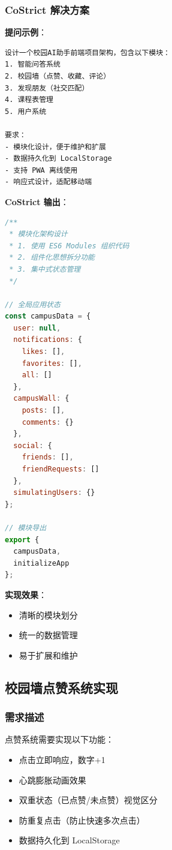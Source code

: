 \documentclass[12pt,a4paper]{article}
\begin{document}
\subsubsection{CoStrict 解决方案}

\textbf{提问示例}：
\begin{verbatim}
设计一个校园AI助手前端项目架构，包含以下模块：
1. 智能问答系统
2. 校园墙（点赞、收藏、评论）
3. 发现朋友（社交匹配）
4. 课程表管理
5. 用户系统

要求：
- 模块化设计，便于维护和扩展
- 数据持久化到 LocalStorage
- 支持 PWA 离线使用
- 响应式设计，适配移动端
\end{verbatim}

\textbf{CoStrict 输出}：

\begin{lstlisting}[language=JavaScript, caption={模块化架构设计}]
/**
 * 模块化架构设计
 * 1. 使用 ES6 Modules 组织代码
 * 2. 组件化思想拆分功能
 * 3. 集中式状态管理
 */

// 全局应用状态
const campusData = {
  user: null,
  notifications: {
    likes: [],
    favorites: [],
    all: []
  },
  campusWall: {
    posts: [],
    comments: {}
  },
  social: {
    friends: [],
    friendRequests: []
  },
  simulatingUsers: {}
};

// 模块导出
export {
  campusData,
  initializeApp
};
\end{lstlisting}

\textbf{实现效果}：
\begin{itemize}
    \item 清晰的模块划分
    \item 统一的数据管理
    \item 易于扩展和维护
\end{itemize}

\subsection{校园墙点赞系统实现}

\subsubsection{需求描述}

点赞系统需要实现以下功能：
\begin{itemize}
    \item 点击立即响应，数字+1
    \item 心跳膨胀动画效果
    \item 双重状态（已点赞/未点赞）视觉区分
    \item 防重复点击（防止快速多次点击）
    \item 数据持久化到 LocalStorage
\end{itemize}
\end{document}
